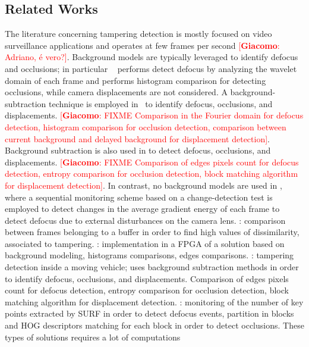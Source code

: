 \documentclass{llncs}
\newcommand{\gi}[1]{{\textcolor{red}{[\small \textbf{Giacomo}: #1]}}}
\begin{document}
\subsection{Related Works}\label{subsec:relWorks}
The literature concerning tampering detection is mostly focused on video surveillance applications and operates at few frames per second \gi{Adriano, \'e vero?}. Background models are typically leveraged to identify defocus and occlusions; in particular  ~\cite{aksay2007camera} performs detect defocus by analyzing the wavelet domain of each frame and performs histogram comparison for detecting occlusions, while camera displacements are not considered. A background-subtraction technique is employed in~\cite{saglam2009real} to identify defocus, occlusions, and displacements. \gi{FIXME Comparison in the Fourier domain for defocus detection, histogram comparison for occlusion detection, comparison between current background and delayed background for displacement detection}. Background subtraction is also used in \cite{gil2007automatic} to detect defocus, occlusions, and displacements. \gi{FIXME Comparison of edges pixels count for defocus detection, entropy comparison for occlusion detection, block matching algorithm for displacement detection}.
In contrast, no background models are used in \cite{alippi2010detecting}, where a sequential monitoring scheme based on a change-detection test is employed to detect changes in the average gradient energy of each frame to detect defocus due to external disturbances on the camera lens.  
\cite{ribnick2006real}: comparison between frames belonging to a buffer in order to find high values of dissimilarity, associated to tampering.
\cite{kryjak2012fpga}: implementation in a FPGA of a solution based on background modeling, histograms comparisons, edges comparisons.
\cite{harasse2004automated}: tampering detection inside a moving vehicle; uses background subtraction methods in order to identify defocus, occlusions, and displacements. Comparison of edges pixels count for defocus detection, entropy comparison for occlusion detection, block matching algorithm for displacement detection.
\cite{tsesmelis2013tamper}: monitoring of the number of key points extracted by SURF in order to detect defocus events, partition in blocks and HOG descriptors matching for each block in order to detect occlusions. These types of solutions requires a lot of computations
%
%
%
\end{document}
